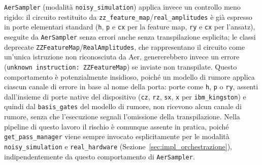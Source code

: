 \texttt{AerSampler} (modalità \texttt{noisy\_simulation}) applica invece un controllo meno rigido: il circuito restituito da \texttt{zz\_feature\_map}/\texttt{real\_amplitudes} è già espresso in porte elementari standard (\texttt{h}, \texttt{p} e \texttt{cx} per la feature map, \texttt{ry} e \texttt{cx} per l'ansatz), eseguite da \texttt{AerSampler} senza errori anche senza transpilazione esplicita; le classi deprecate \texttt{ZZFeatureMap}/\texttt{RealAmplitudes}, che rappresentano il circuito come un'unica istruzione non riconosciuta da Aer, genererebbero invece un errore (\texttt{unknown instruction: ZZFeatureMap}) se inviate non transpilate. Questo comportamento è potenzialmente insidioso, poiché un modello di rumore applica ciascun canale di errore in base al nome della porta: porte come \texttt{h}, \texttt{p} o \texttt{ry}, assenti dall'insieme di porte native del dispositivo (\texttt{cz}, \texttt{rz}, \texttt{sx}, \texttt{x} per \texttt{ibm\_kingston}) e quindi dal \texttt{basis\_gates} del modello di rumore, non ricevono alcun canale di rumore, senza che l'esecuzione segnali l'omissione della transpilazione. Nella pipeline di questo lavoro il rischio è comunque assente in pratica, poiché \texttt{get\_pass\_manager} viene sempre invocato esplicitamente per le modalità \texttt{noisy\_simulation} e \texttt{real\_hardware} (Sezione~\ref{sec:impl_orchestrazione}), indipendentemente da questo comportamento di \texttt{AerSampler}.


